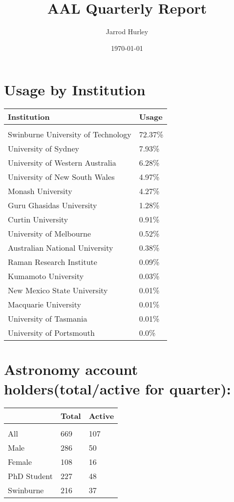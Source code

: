 \documentclass{article}%
\title{AAL Quarterly Report}%
\author{Jarrod Hurley}%
\date{\today}%
\begin{document}
%
\normalsize%
\maketitle%
\newpage%
\section{Usage by Institution }%

%
\begin{longtabu}{X[l] X[r]}%
\textbf{Institution}&\textbf{Usage}\\%
\hline%
&\\%
Swinburne University of Technology&72.37\%\\%
\hline%
University of Sydney&7.93\%\\%
\hline%
University of Western Australia&6.28\%\\%
\hline%
University of New South Wales&4.97\%\\%
\hline%
Monash University&4.27\%\\%
\hline%
Guru Ghasidas University&1.28\%\\%
\hline%
Curtin University&0.91\%\\%
\hline%
University of Melbourne&0.52\%\\%
\hline%
Australian National University&0.38\%\\%
\hline%
Raman Research Institute&0.09\%\\%
\hline%
Kumamoto University&0.03\%\\%
\hline%
New Mexico State University&0.01\%\\%
\hline%
Macquarie University&0.01\%\\%
\hline%
University of Tasmania&0.01\%\\%
\hline%
University of Portsmouth&0.0\%\\%
\hline%
\end{longtabu}%
\section{Astronomy account holders(total/active for quarter): }%

%
\begin{longtabu}{X[l] X[r] X[r]}%
\textbf{}&\textbf{Total}&\textbf{Active}\\%
\hline%
&&\\%
All&669&107\\%
\hline%
Male&286&50\\%
\hline%
Female&108&16\\%
\hline%
PhD Student&227&48\\%
\hline%
Swinburne&216&37\\%
\hline%
\end{longtabu}%
\end{document}
